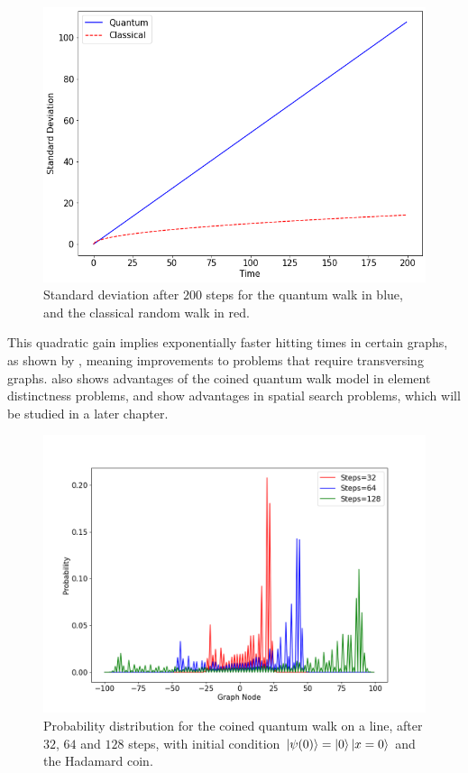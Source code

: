 \documentclass[../../dissertation.tex]{subfiles}
\begin{document}
\begin{figure}[!h]
	\centering
	\includegraphics[scale=0.40]{img/CoinedQuantumWalk/coinedClassicalStdDev.png}
	\caption{Standard deviation after $200$ steps for the quantum walk in blue, and the classical random walk in red.} 
	\label{fig:coinedClassicalStdDev}
\end{figure}\par

This quadratic gain implies exponentially faster hitting times in certain
graphs, as shown by \cite{childs2002}, meaning improvements to problems that
require transversing graphs. \cite{ambainis2003} also shows advantages of the
coined quantum walk model in element distinctness problems, and
\cite{childs2004} show advantages in spatial search problems, which will be
studied in a later chapter.
\begin{figure}[!h]
	\centering
	\includegraphics[scale=0.40]{img/CoinedQuantumWalk/CoinedMultiple_psi0_3264128.png}
	\caption{Probability distribution for the coined quantum walk on a line, after $32$, $64$ and $128$ steps, with initial condition $\ket{\psi(0)}=\ket{0}\ket{x=0}$ and the Hadamard coin.} 
	\label{fig:coinedQWDist0}
\end{figure}\par
\end{document}

